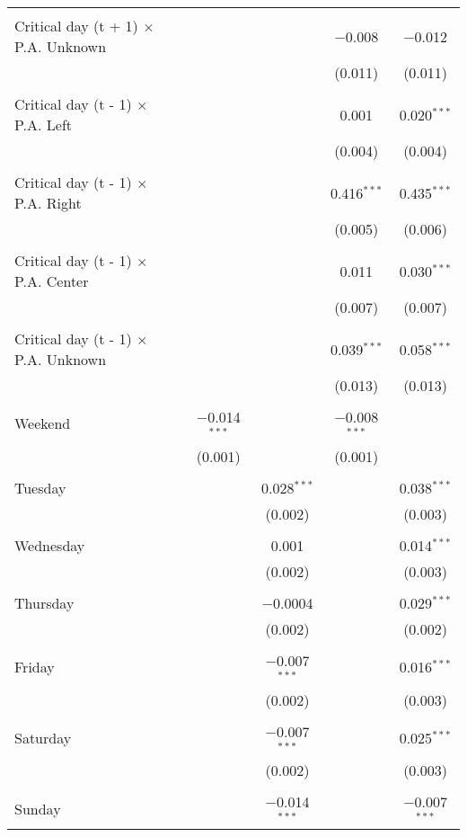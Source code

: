 \documentclass[
]{article}
\begin{document}
\begin{table}[!htbp]
{\begin{tabular}{@{\extracolsep{5pt}}lcccc}
  & & & & \\ 
 Critical day (t + 1) $\times$ P.A. Unknown &  &  & $-$0.008 & $-$0.012 \\ 
  &  &  & (0.011) & (0.011) \\ 
  & & & & \\ 
 Critical day (t - 1) $\times$ P.A. Left &  &  & 0.001 & 0.020$^{***}$ \\ 
  &  &  & (0.004) & (0.004) \\ 
  & & & & \\ 
 Critical day (t - 1) $\times$ P.A. Right &  &  & 0.416$^{***}$ & 0.435$^{***}$ \\ 
  &  &  & (0.005) & (0.006) \\ 
  & & & & \\ 
 Critical day (t - 1) $\times$ P.A. Center &  &  & 0.011 & 0.030$^{***}$ \\ 
  &  &  & (0.007) & (0.007) \\ 
  & & & & \\ 
 Critical day (t - 1) $\times$ P.A. Unknown &  &  & 0.039$^{***}$ & 0.058$^{***}$ \\ 
  &  &  & (0.013) & (0.013) \\ 
  & & & & \\ 
 Weekend & $-$0.014$^{***}$ &  & $-$0.008$^{***}$ &  \\ 
  & (0.001) &  & (0.001) &  \\ 
  & & & & \\ 
 Tuesday &  & 0.028$^{***}$ &  & 0.038$^{***}$ \\ 
  &  & (0.002) &  & (0.003) \\ 
  & & & & \\ 
 Wednesday &  & 0.001 &  & 0.014$^{***}$ \\ 
  &  & (0.002) &  & (0.003) \\ 
  & & & & \\ 
 Thursday &  & $-$0.0004 &  & 0.029$^{***}$ \\ 
  &  & (0.002) &  & (0.002) \\ 
  & & & & \\ 
 Friday &  & $-$0.007$^{***}$ &  & 0.016$^{***}$ \\ 
  &  & (0.002) &  & (0.003) \\ 
  & & & & \\ 
 Saturday &  & $-$0.007$^{***}$ &  & 0.025$^{***}$ \\ 
  &  & (0.002) &  & (0.003) \\ 
  & & & & \\ 
 Sunday &  & $-$0.014$^{***}$ &  & $-$0.007$^{***}$ \\ 

\end{tabular}}
\end{table}
\end{document}
